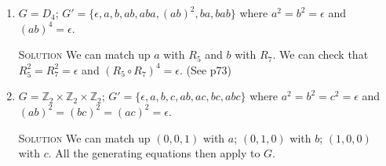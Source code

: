 \documentclass[twoside]{amsart}
\newcommand{\Integers}{\ensuremath{\mathbb{Z}{}}\xspace}
\newcommand{\solution}{\textsc{Solution}\xspace}
\newcommand{\iso}{\cong}
\newcommand{\blank}{\vspace{5pt}}
\begin{document}
\begin{enumerate}[A.]
\begin{enumerate}[1]
      \blank \noindent \solution We can check that $(1,3)^2 = \epsilon$
      and $(2,3)^2 = \epsilon$ and $(1,3)(2,3)(1,3) = (2,3)(1,3)(2,3)$.
      Therefore, $G \iso G'$ because we can match up the defining
      equations for each. We can match up $a$ with $(1,3)$ and
      $b$ with $(2,3)$.

      \blank
      \item $G=D_4$; $G'=\{\epsilon, a, b, ab, aba, (ab)^2, ba, bab\}$
      where $a^2=b^2=\epsilon$ and $(ab)^4 = \epsilon$.

      \blank \noindent \solution We can match up $a$ with $R_5$ and
      $b$ with $R_7$. We can check that $R_5^2 = R_7^2 = \epsilon$ and
      $(R_5 \circ R_7)^4 = \epsilon$. (See p73)

      \blank
      \item $G = \Integers_2 \times \Integers_2 \times \Integers_2$;
      $G' = \{\epsilon, a, b, c, ab, ac, bc, abc \}$ where $a^2=b^2=c^2
      =\epsilon$ and $(ab)^2=(bc)^2=(ac)^2=\epsilon$.

      \blank \noindent \solution We can match up $(0,0,1)$ with $a$;
      $(0,1,0)$ with $b$; $(1,0,0)$ with $c$. All the generating
      equations then apply to $G$.


   \end{enumerate}

\end{enumerate}
\end{document}

